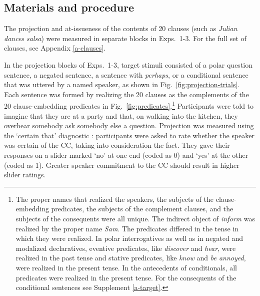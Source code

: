 \documentclass[11pt,fleqn]{article}
\newcommand{\6}{\mbox{$[\hspace*{-.6mm}[$}}
\newcommand{\9}{\mbox{$]\hspace*{-.6mm}]$}}
\begin{document}
\subsection{Materials and procedure}

The projection and at-issueness of the contents of 20 clauses (such as {\em Julian dances salsa}) were measured in separate blocks in Exps.~1-3. For the full set of clauses, see Appendix \ref{a-clauses}. 

In the projection blocks of Exps.~1-3, target stimuli consisted of a polar question sentence, a negated sentence, a sentence with {\em perhaps}, or a conditional sentence that was uttered by a named speaker, as shown in Fig.~\ref{fig:projection-trials}. Each sentence was formed by realizing the 20 clauses as the complements of the 20 clause-embedding predicates in Fig.~\ref{fig:predicates}.\footnote{The proper names that realized the speakers, the subjects of the clause-embedding predicates, the subjects of the complement clauses, and the subjects of the consequents  were all unique. The indirect object of {\em inform} was realized by the proper name {\em Sam}. The predicates differed in the tense in which they were realized. In polar interrogatives as well as in negated and modalized declaratives, eventive predicates, like {\em discover} and {\em hear}, were realized in the past tense and stative predicates, like {\em know} and {\em be annoyed}, were realized in the present tense.  In the antecedents of conditionals, all predicates were realized in the present tense. For the consequents of the conditional sentences see Supplement \ref{a-target}.} Participants were told to imagine that they are at a party and that, on walking into the kitchen, they overhear somebody ask somebody else a question. Projection was measured using the `certain that' diagnostic \cite{djaerv-bacovcin-salt27,tbd-variability, lorson2018, mahler2020}: participants were asked to rate whether the speaker was certain of the CC, taking into consideration the fact. They gave their responses on a slider marked `no' at one end (coded as 0) and `yes' at the other (coded as 1). Greater speaker commitment to the CC should result in higher slider ratings.
\end{document}

